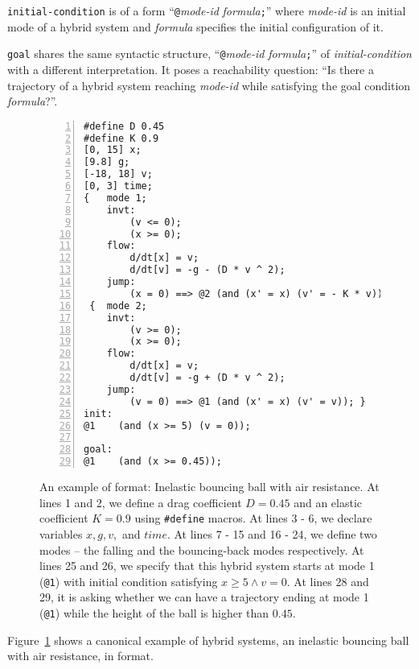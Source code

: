 \texttt{initial-condition} is of a form
``\texttt{@}\textit{mode-id} \textit{formula}\texttt{;}''
where \textit{mode-id} is an initial mode of a hybrid system and
\textit{formula} specifies the initial configuration of it.

\texttt{goal} shares the same syntactic structure,
``\texttt{@}\textit{mode-id} \textit{formula}\texttt{;}'' of
\textit{initial-condition} with a different interpretation. It poses a
reachability question: ``Is there a trajectory of a hybrid system
reaching \textit{mode-id} while satisfying the goal condition \textit{formula}?''.

\begin{figure}
  \centering
  \begin{Verbatim}[fontfamily=courier, frame=single, framesep=1mm,
  numbers=left, fontsize=\scriptsize]
#define D 0.45
#define K 0.9
[0, 15] x;
[9.8] g;
[-18, 18] v;
[0, 3] time;
{   mode 1;
    invt:
        (v <= 0);
        (x >= 0);
    flow:
        d/dt[x] = v;
        d/dt[v] = -g - (D * v ^ 2);
    jump:
        (x = 0) ==> @2 (and (x' = x) (v' = - K * v)); }
 {  mode 2;
    invt:
        (v >= 0);
        (x >= 0);
    flow:
        d/dt[x] = v;
        d/dt[v] = -g + (D * v ^ 2);
    jump:
        (v = 0) ==> @1 (and (x' = x) (v' = v)); }
init:
@1    (and (x >= 5) (v = 0));

goal:
@1    (and (x >= 0.45));
\end{Verbatim}
\caption{An example of \drh{} format: Inelastic bouncing ball with air
  resistance. At lines 1 and 2, we define a drag coefficient $D = 0.45$
  and an elastic coefficient $K = 0.9$ using \texttt{\#define} macros.
  At lines 3 - 6, we declare variables $x, g, v,$ and $time$. At lines
  7 - 15 and 16 - 24, we define two modes -- the falling and the
  bouncing-back modes respectively. At lines 25 and 26, we specify
  that this hybrid system starts at mode 1 (\texttt{@1}) with initial
  condition satisfying $x \ge 5 \land v = 0$. At lines 28 and 29, it
  is asking whether we can have a trajectory ending at mode 1
  (\texttt{@1}) while the height of the ball is higher than $0.45$.}
\label{fig:bouncing-ball-drh}
\end{figure}

Figure~\ref{fig:bouncing-ball-drh} shows a canonical example of hybrid
systems, an inelastic bouncing ball with air resistance, in \drh{}
format.

